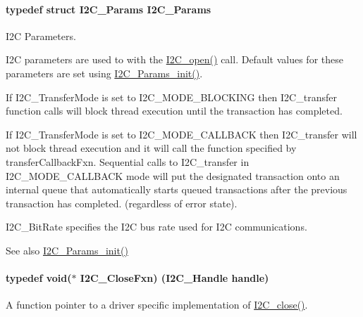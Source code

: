 \paragraph[{I2\+C\+\_\+\+Params}]{\setlength{\rightskip}{0pt plus 5cm}typedef struct {\bf I2\+C\+\_\+\+Params}  {\bf I2\+C\+\_\+\+Params}}\label{_i2_c_8h_ae6b2a2e3bc3716b5716ad6c1f10d7c1d}


I2\+C Parameters. 

I2\+C parameters are used to with the \hyperlink{_i2_c_8h_ae1aa99e1fee4517406018e10025cca0e}{I2\+C\+\_\+open()} call. Default values for these parameters are set using \hyperlink{_i2_c_8h_ab11636302074d67180207ab81ceb323c}{I2\+C\+\_\+\+Params\+\_\+init()}.

If I2\+C\+\_\+\+Transfer\+Mode is set to I2\+C\+\_\+\+M\+O\+D\+E\+\_\+\+B\+L\+O\+C\+K\+I\+N\+G then I2\+C\+\_\+transfer function calls will block thread execution until the transaction has completed.

If I2\+C\+\_\+\+Transfer\+Mode is set to I2\+C\+\_\+\+M\+O\+D\+E\+\_\+\+C\+A\+L\+L\+B\+A\+C\+K then I2\+C\+\_\+transfer will not block thread execution and it will call the function specified by transfer\+Callback\+Fxn. Sequential calls to I2\+C\+\_\+transfer in I2\+C\+\_\+\+M\+O\+D\+E\+\_\+\+C\+A\+L\+L\+B\+A\+C\+K mode will put the designated transaction onto an internal queue that automatically starts queued transactions after the previous transaction has completed. (regardless of error state).

I2\+C\+\_\+\+Bit\+Rate specifies the I2\+C bus rate used for I2\+C communications.

\begin{DoxySeeAlso}{See also}
\hyperlink{_i2_c_8h_ab11636302074d67180207ab81ceb323c}{I2\+C\+\_\+\+Params\+\_\+init()} 
\end{DoxySeeAlso}
\paragraph[{I2\+C\+\_\+\+Close\+Fxn}]{\setlength{\rightskip}{0pt plus 5cm}typedef void($\ast$ I2\+C\+\_\+\+Close\+Fxn) ({\bf I2\+C\+\_\+\+Handle} handle)}\label{_i2_c_8h_a083200108e980a0ef61e458f0b9fb9e7}


A function pointer to a driver specific implementation of \hyperlink{_i2_c_8h_a12c86d89a687f2ee1eb980d99c32326d}{I2\+C\+\_\+close()}. 

